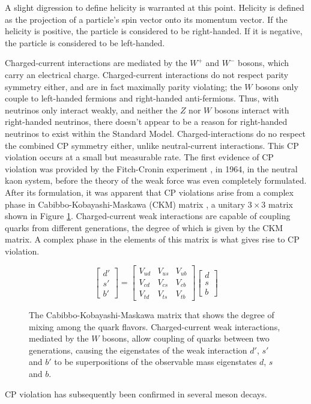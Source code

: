 \documentclass[12pt,a4paper,openright,twoside]{report}
\begin{document}
A slight digression to define helicity is warranted at this point. Helicity is defined as the projection of a particle's spin vector onto its momentum vector. If the helicity is positive, the particle is considered to be right-handed. If it is negative, the particle is considered to be left-handed.

Charged-current interactions are mediated by the $W^+$ and $W^-$ bosons, which carry an electrical charge. Charged-current interactions do not respect parity symmetry either, and are in fact maximally parity violating; the $W$ bosons only couple to left-handed fermions and right-handed anti-fermions. Thus, with neutrinos only interact weakly, and neither the $Z$ nor $W$ bosons interact with right-handed neutrinos, there doesn't appear to be a reason for right-handed neutrinos to exist within the Standard Model. Charged-interactions do no respect the combined CP symmetry either, unlike neutral-current interactions. This CP violation occurs at a small but measurable rate. The first evidence of CP violation was provided by the Fitch-Cronin experiment \cite{cronin_fitch}, in 1964, in the neutral kaon system, before the theory of the weak force was even completely formulated. After its formulation, it was apparent that CP violations arise from a complex phase in Cabibbo-Kobayashi-Maskawa (CKM) matrix \cite{CKM}, a unitary $3\times 3$ matrix shown in Figure \ref{fig:CKM matrix}. Charged-current weak interactions are capable of coupling quarks from different generations, the degree of which is given by the CKM matrix. A complex phase in the elements of this matrix is what gives rise to CP violation.
\begin{figure}[H]
\[
\begin{bmatrix}
d'\\
s'\\
b'
\end{bmatrix}
=
\begin{bmatrix}
V_{ud} & V_{us} & V_{ub}\\
V_{cd} & V_{cs} & V_{cb}\\
V_{td} & V_{ts} & V_{tb}
\end{bmatrix}
\begin{bmatrix}
d\\
s\\
b
\end{bmatrix}
\]
\caption{The Cabibbo-Kobayashi-Maskawa matrix that shows the degree of mixing among the quark flavors. Charged-current weak interactions, mediated by the $W$ bosons, allow coupling of quarks between two generations, causing the eigenstates of the weak interaction $d'$, $s'$ and $b'$ to be superpositions of the observable mass eigenstates $d$, $s$ and $b$.}
\label{fig:CKM matrix}
\end{figure}
CP violation has subsequently been confirmed in several meson decays\cite{CP1,CP2,CP3,CP4,CP5,CP6}.
\end{document}
